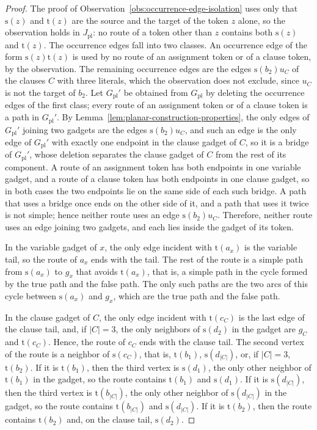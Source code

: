 \documentclass[a4paper,USenglish,thm-restate]{lipics-v2021}
\newcommand{\src}{\mathrm{s}}
\newcommand{\tgt}{\mathrm{t}}
\theoremstyle{problemstyle}
\begin{document}
\begin{proof}
The proof of Observation~\ref{obs:occurrence-edge-isolation} uses only that
$\src(z)$ and $\tgt(z)$ are the source and the target of the token $z$
alone, so the observation holds in $J_{\mathrm{pl}}$: no route of a token
other than $z$ contains both $\src(z)$ and $\tgt(z)$. The occurrence edges
fall into two classes. An occurrence edge of the form $\src(z)\tgt(z)$ is
used by no route of an assignment token or of a clause token, by the
observation. The remaining occurrence edges are the edges $\src(b_2)u_C$
of the clauses $C$ with three literals, which the observation does not
exclude, since $u_C$ is not the target of $b_2$. Let $G_{\mathrm{pl}}'$ be
obtained from $G_{\mathrm{pl}}$ by deleting the occurrence edges of the
first class; every route of an assignment token or of a clause token is a
path in $G_{\mathrm{pl}}'$. By Lemma~\ref{lem:planar-construction-properties},
the only edges of $G_{\mathrm{pl}}'$ joining two gadgets are the edges
$\src(b_2)u_C$, and such an edge is the only edge of $G_{\mathrm{pl}}'$
with exactly one endpoint in the clause gadget of $C$, so it is a bridge
of $G_{\mathrm{pl}}'$, whose deletion separates the clause gadget of $C$
from the rest of its component. A route of an assignment token has both
endpoints in one variable gadget, and a route of a clause token has both
endpoints in one clause gadget, so in both cases the two endpoints lie on
the same side of each such bridge. A path that uses a bridge once ends on
the other side of it, and a path that uses it twice is not simple; hence
neither route uses an edge $\src(b_2)u_C$. Therefore, neither route uses an
edge joining two gadgets, and each lies inside the gadget of its token.

In the variable gadget of $x$, the only edge incident with $\tgt(a_x)$ is
the variable tail, so the route of $a_x$ ends with the tail. The rest of
the route is a simple path from $\src(a_x)$ to $g_x$ that avoids
$\tgt(a_x)$, that is, a simple path in the cycle formed by the true path
and the false path. The only such paths are the two arcs of this cycle
between $\src(a_x)$ and $g_x$, which are the true path and the false path.

In the clause gadget of $C$, the only edge incident with $\tgt(c_C)$ is
the last edge of the clause tail, and, if $|C|=3$, the only neighbors of
$\src(d_2)$ in the gadget are $g_C$ and $\tgt(c_C)$. Hence, the route of $c_C$ ends with
the clause tail. The second vertex of the route is a neighbor of
$\src(c_C)$, that is, $\tgt(b_1)$, $\src(d_{|C|})$, or, if $|C|=3$,
$\tgt(b_2)$. If it is $\tgt(b_1)$, then the third vertex is $\src(d_1)$,
the only other neighbor of $\tgt(b_1)$ in the gadget, so the route
contains $\tgt(b_1)$
and $\src(d_1)$. If it is $\src(d_{|C|})$, then the third vertex is
$\tgt(b_{|C|})$, the only other neighbor of $\src(d_{|C|})$ in the gadget, so the
route contains $\tgt(b_{|C|})$ and $\src(d_{|C|})$. If it is $\tgt(b_2)$, then
the route contains $\tgt(b_2)$ and, on the clause tail, $\src(d_2)$.
\end{proof}
\end{document}
